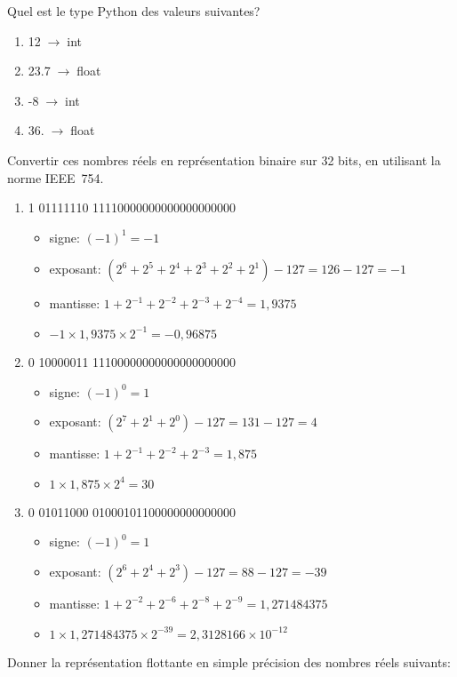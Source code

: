 \documentclass[a4paper,11pt]{article}
\begin{document}
\begin{Form}
\begin{exo}
Quel est le type Python des valeurs suivantes?
\begin{enumerate}
\item 12$\;\rightarrow\;$int
\item 23.7$\;\rightarrow\;$float
\item -8$\;\rightarrow\;$int
\item 36.$\;\rightarrow\;$float
\end{enumerate}
\end{exo}
\begin{exo}
Convertir ces nombres réels en représentation binaire sur 32 bits, en utilisant la norme IEEE~754.
\begin{enumerate}
\item 1 01111110 11110000000000000000000
\begin{itemize}
\item signe: $(-1)^1=-1$
\item exposant: $(2^6+2^5+2^4+2^3+2^2+2^1)-127=126-127=-1$
\item mantisse: $1+2^{-1}+2^{-2}+2^{-3}+2^{-4} = 1,9375$
\item $-1×1,9375×2^{-1}=-0,96875$
\end{itemize}
\item 0 10000011 11100000000000000000000
\begin{itemize}
\item signe: $(-1)^0=1$
\item exposant: $(2^7+2^1+2^0)-127=131-127=4$
\item mantisse: $1+2^{-1}+2^{-2}+2^{-3} = 1,875$
\item $1×1,875×2^{4}=30$
\end{itemize}
\item 0 01011000 01000101100000000000000
\begin{itemize}
\item signe: $(-1)^0=1$
\item exposant: $(2^6+2^4+2^3)-127=88-127=-39$
\item mantisse: $1+2^{-2}+2^{-6}+2^{-8}+2^{-9} = 1,271484375$
\item $1×1,271484375×2^{-39}=2,3128166×10^{-12}$
\end{itemize}
\end{enumerate}
\end{exo}
\begin{exo}
Donner la représentation flottante en simple précision des nombres réels suivants:

\end{exo}
\end{Form}
\end{document}
